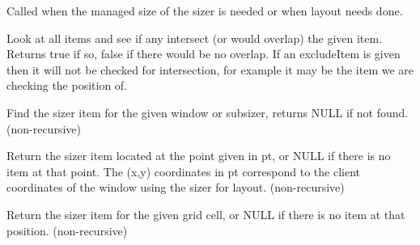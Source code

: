 \label{wxgridbagsizercalcmin}


Called when the managed size of the sizer is needed or when layout
needs done.


\label{wxgridbagsizercheckforintersection}



Look at all items and see if any intersect (or would overlap) the given
item.  Returns true if so, false if there would be no overlap.  If an
excludeItem is given then it will not be checked for intersection, for
example it may be the item we are checking the position of.



\label{wxgridbagsizerfinditem}



Find the sizer item for the given window or subsizer, returns NULL if
not found. (non-recursive)



\label{wxgridbagsizerfinditematpoint}


Return the sizer item located at the point given in pt, or NULL if
there is no item at that point. The (x,y) coordinates in pt correspond
to the client coordinates of the window using the sizer for
layout. (non-recursive)



\label{wxgridbagsizerfinditematposition}


Return the sizer item for the given grid cell, or NULL if there is no
item at that position. (non-recursive)



